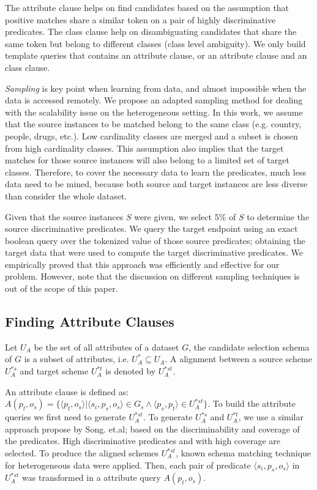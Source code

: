 The attribute clause helps on find candidates based on the assumption that positive matches share a similar token on a pair of highly discriminative predicates. The class clause help on disambiguating candidates that share the same token but belong to different classes (class level ambiguity).  We only build template queries that contains an attribute clause, or an attribute clause and an class clause. 


\emph{Sampling} is key point when learning from data, and almost impossible when the data is accessed remotely. We propose an adapted sampling method for dealing with the scalability issue on the heterogeneous setting. In this work, we assume that the source instances to be matched belong to the same class (e.g. country, people, drugs, etc.). Low cardinality classes are merged and a subset is chosen from high cardinality classes. This assumption also implies that the target matches for those source instances will also belong to a limited set of target classes. Therefore, to cover the necessary data to learn the predicates, much less data need to be mined, because both source and target instances are less diverse than consider the whole dataset.

Given that the source instances $S$ were given, we select 5\% of $S$ to determine the source discriminative predicates. We query the target endpoint using an exact boolean query over the tokenized value of those source predicates; obtaining the target data that were used to compute the target discriminative predicates. We empirically proved that this approach was efficiently and effective for our problem. However, note that the discussion on different sampling techniques is out of the scope of this paper.

\subsection{Finding Attribute Clauses}

Let $U_A$ be the set of all attributes of a dataset $G$, the candidate selection schema of $G$ is a subset of attributes, i.e. $U^*_A  \subseteq U_A$.  A alignment between a source scheme $U^{*s}_A$ and target scheme $U^{*t}_A$ is denoted by $U^{*st}_A$.

An attribute clause is defined as: $A(p_t,o_s)=\{\langle p_t,o_s \rangle | \langle s_i, p_s, o_s \rangle \in G_s \land \langle p_s, p_t \rangle \in U^{*st}_A\}$. To build the attribute queries we first need to generate $U^{*st}_A$. To generate $U^{*s}_A$ and $U^{*t}_A$, we use a similar approach propose by Song. et.al; based on the discriminability and coverage of the predicates. High discriminative predicates and with high coverage are selected. To produce the aligned schemes $U^{*st}_A$, known schema matching technique for heterogeneous data were applied. Then, each pair of predicate $\langle s_i, p_s, o_s \rangle$ in $U^{*st}_A$ was transformed in a attribute query $A(p_t,o_s)$.

